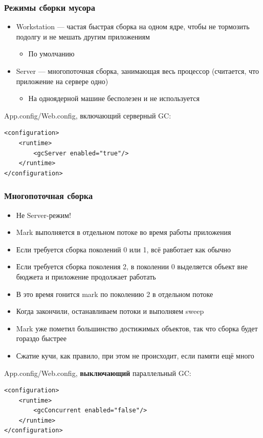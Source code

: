\documentclass[xetex,mathserif,serif]{beamer}
\begin{document}
	\begin{frame}[fragile]
		\frametitle{Режимы сборки мусора}
		\begin{itemize}
			\item Workstation --- частая быстрая сборка на одном ядре, чтобы не тормозить подолгу и не мешать другим приложениям
			\begin{itemize}
				\item По умолчанию
			\end{itemize}
			\item Server --- многопоточная сборка, занимающая весь процессор (считается, что приложение на сервере одно)
			\begin{itemize}
				\item На одноядерной машине бесполезен и не используется
			\end{itemize}
		\end{itemize}
		App.config/Web.config, включающий серверный GC:
		\begin{footnotesize}
			\begin{verbatim}
<configuration>
    <runtime>
        <gcServer enabled="true"/>
    </runtime>
</configuration>
			\end{verbatim}
		\end{footnotesize}
	\end{frame}

	\begin{frame}[fragile]
		\frametitle{Многопоточная сборка}
		\begin{footnotesize}
			\begin{itemize}
				\item Не Server-режим!
				\item Mark выполняется в отдельном потоке во время работы приложения
				\item Если требуется сборка поколений 0 или 1, всё равботает как обычно
				\item Если требуется сборка поколения 2, в поколении 0 выделяется объект вне бюджета и приложение продолжает работать
				\item В это время гонится mark по поколению 2 в отдельном потоке
				\item Когда закончили, останавливаем потоки и выполняем sweep
				\item Mark уже пометил большинство достижимых объектов, так что сборка будет гораздо быстрее
				\item Сжатие кучи, как правило, при этом не происходит, если памяти ещё много
			\end{itemize}
			App.config/Web.config, \textbf{выключающий} параллельный GC:
			\begin{verbatim}
<configuration>
    <runtime>
        <gcConcurrent enabled="false"/>
    </runtime>
</configuration>
			\end{verbatim}
		\end{footnotesize}
	\end{frame}
\end{document}
